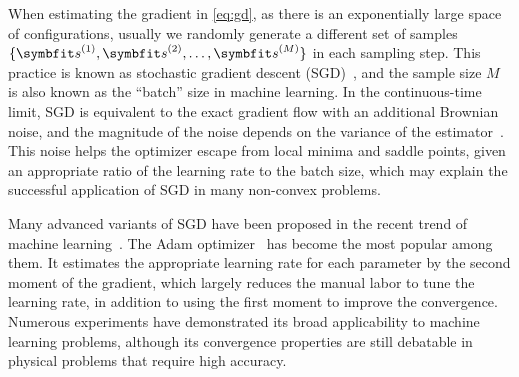 When estimating the gradient in \cref{eq:gd}, as there is an exponentially large space of configurations, usually we randomly generate a different set of samples $\{\vs^{(1)}, \vs^{(2)}, \ldots, \vs^{(M)}\}$ in each sampling step. This practice is known as stochastic gradient descent (SGD)~\cite{robbins1951stochastic, bottou1998online}, and the sample size $M$ is also known as the ``batch'' size in machine learning. In the continuous-time limit, SGD is equivalent to the exact gradient flow with an additional Brownian noise, and the magnitude of the noise depends on the variance of the estimator~\cite{hu2017diffusion}. This noise helps the optimizer escape from local minima and saddle points, given an appropriate ratio of the learning rate to the batch size, which may explain the successful application of SGD in many non-convex problems.

Many advanced variants of SGD have been proposed in the recent trend of machine learning~\cite{kashyap2022survey}. The Adam optimizer~\cite{kingma2014adam} has become the most popular among them. It estimates the appropriate learning rate for each parameter by the second moment of the gradient, which largely reduces the manual labor to tune the learning rate, in addition to using the first moment to improve the convergence. Numerous experiments have demonstrated its broad applicability to machine learning problems, although its convergence properties are still debatable in physical problems that require high accuracy.

